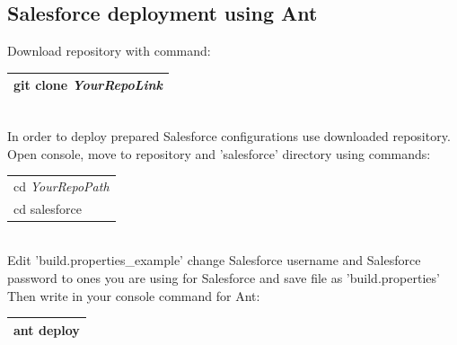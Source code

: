 \documentclass[12pt,a4paper]{article}
\begin{document}
\subsection{Salesforce deployment using Ant}
Download repository with command:\\
\begin{tabular}{|l|}
	\hline
	git clone \textit{YourRepoLink}\\
	\hline
\end{tabular}\\

In order to deploy prepared Salesforce configurations use downloaded repository. Open console, move to repository and 'salesforce' directory using commands:\\

\begin{tabular}{|l|}
	\hline
	cd \textit{YourRepoPath}\\
	cd salesforce\\
	\hline
\end{tabular}\\

Edit 'build.properties\_example' change Salesforce username and Salesforce password to ones you are using for Salesforce and save file as 'build.properties'
Then write in your console command for Ant:

\begin{tabular}{|l|}
	\hline
	ant deploy\\
	\hline
\end{tabular}\\
\end{document}

